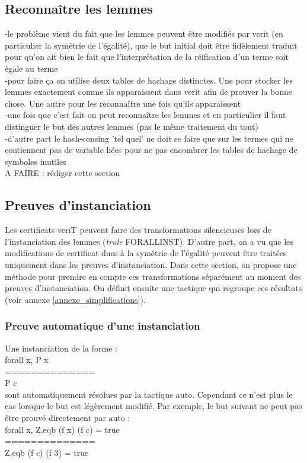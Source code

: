 \documentclass[11pt]{article}
\begin{document}
\subsection{Reconnaître les lemmes}
-le problème vient du fait que les lemmes peuvent être modifiés par verit (en particulier la symétrie de l'égalité), que le but initial doit être fidèlement traduit pour qu'on ait bien le fait que l'interprétation de la réification d'un terme soit égale au terme \\
-pour faire ça on utilise deux tables de hachage distinctes. Une pour stocker les lemmes exactement comme ils apparaissent dans verit afin de prouver la bonne chose. Une autre pour les reconnaître une fois qu'ils apparaissent\\
-une fois que c'est fait on peut reconnaître les lemmes et en particulier il faut distinguer le but des autres lemmes (pas le même traitement du tout)\\
-d'autre part le hash-consing 'tel quel' ne doit se faire que sur les termes qui ne contiennent pas de variable liées pour ne pas encombrer les tables de hachage de symboles inutiles\\

A FAIRE : rédiger cette section



\subsection{Preuves d'instanciation}

Les certificats veriT peuvent faire des transformations silencieuses lors de l'instanciation des lemmes (\textit{trule} FORALLINST). D'autre part, on a vu que les modifications de certificat dues à la symétrie de l'égalité peuvent être traitées uniquement dans les preuves d'instanciation. Dans cette section, on propose une méthode pour prendre en compte ces transformations séparément au moment des preuves d'instanciation. On définit ensuite une tactique qui regroupe ces résultats (voir annexe \ref{annexe_simplifications}).

\subsubsection{Preuve automatique d'une instanciation}

Une instanciation de la forme :\\
forall x, P x \\
==============\\
P c \\
sont automatiquement résolues par la tactique auto. Cependant ce n'est plus le cas lorsque le but est légèrement modifié. Par exemple, le but suivant ne peut pas être prouvé directement par auto : \\
forall x, Z.eqb (f x) (f c) = true \\
==============\\
Z.eqb (f c) (f 3) = true \\
\end{document}
